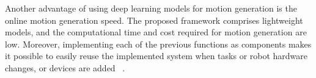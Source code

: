 Another advantage of using deep learning models for motion generation is the online motion generation speed. The proposed framework comprises lightweight models, and the computational time and cost required for motion generation are low. Moreover, implementing each of the previous functions as components makes it possible to easily reuse the implemented system when tasks or robot hardware changes, or devices are added ~\cite{Kanamura2021sensors}.

